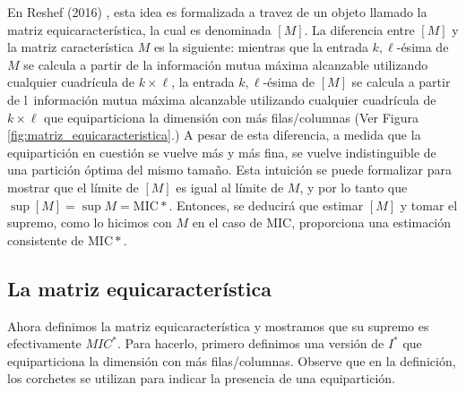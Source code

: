         En Reshef (2016) \cite{Reshef2016}, esta idea es formalizada a travez de un objeto llamado la matriz equicaracter\'istica, la cual es denominada $[M]$. La diferencia entre $[M]$ y la matriz caracter\'istica $M$ es la siguiente: mientras que la entrada $k, \ell$-\'esima de $M$ se calcula a partir de la informaci\'on mutua m\'axima alcanzable utilizando cualquier cuadr\'icula de $k\times\ell$, la entrada $k, \ell$-\'esima de $[M]$ se calcula a partir de l\ informaci\'on mutua m\'axima alcanzable utilizando cualquier cuadr\'icula de $k\times\ell$ que equiparticiona la dimensi\'on con m\'as filas/columnas (Ver Figura \ref{fig:matriz_equicaracteristica}.) A pesar de esta diferencia, a medida que la equipartici\'on en cuesti\'on se vuelve m\'as y m\'as fina, se vuelve indistinguible de una partici\'on \'optima del mismo tama\~no. Esta intuici\'on se puede formalizar para mostrar que el l\'imite de $[M]$ es igual al l\'imite de $M$, y por lo tanto que $\sup [M]=\sup M=\mathrm{MIC}*$. Entonces, se deducir\'a que estimar $[M]$ y tomar el supremo, como lo hicimos con $M$ en el caso de MIC, proporciona una estimaci\'on consistente de $\mathrm{MIC}*$.
    
        \subsection{La matriz equicaracter\'istica} 
    
        Ahora definimos la matriz equicaracter\'istica y mostramos que su supremo es efectivamente $MIC^*$. Para hacerlo, primero definimos una versi\'on de $I^*$ que equiparticiona la dimensi\'on con m\'as filas/columnas. Observe que en la definici\'on, los corchetes se utilizan para indicar la presencia de una equipartici\'on.
    
